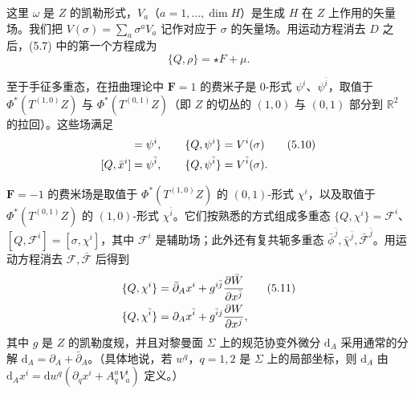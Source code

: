 \documentclass[11pt,a4paper,UTF8]{ctexart}
\theoremstyle{plain}
\theoremstyle{definition}
\begin{document}
这里 $\omega$ 是 $Z$ 的凯勒形式，$V_a$（$a=1,\dots,\dim H$）是生成 $H$ 在 $Z$ 上作用的矢量场。我们把 $V(\sigma)=\sum_a\sigma^aV_a$ 记作对应于 $\sigma$ 的矢量场。用运动方程消去 $D$ 之后，(5.7) 中的第一个方程成为
\begin{equation}
    \{Q,\rho\}=\star F+\mu.
    \tag{5.9}
\end{equation}

至于手征多重态，在扭曲理论中 $\mathbf F=1$ 的费米子是 0-形式 $\psi^i$、$\psi^{\bar i}$，取值于 $\Phi^*(T^{(1,0)}Z)$ 与 $\Phi^*(T^{(0,1)}Z)$（即 $Z$ 的切丛的 $(1,0)$ 与 $(0,1)$ 部分到 $\mathbb R^2$ 的拉回）。这些场满足
\begin{align}
    [Q,x^i]&=\psi^i,\qquad \{Q,\psi^i\}=V^i(\sigma) \tag{5.10}\\
    [Q,\bar x^i]&=\psi^{\bar i},\qquad \{Q,\psi^{\bar i}\}=V^{\bar i}(\sigma). \notag
\end{align}


$\mathbf F=-1$ 的费米场是取值于 $\Phi^*(T^{(1,0)}Z)$ 的 $(0,1)$-形式 $\chi^i$，以及取值于 $\Phi^*(T^{(0,1)}Z)$ 的 $(1,0)$-形式 $\chi^{\bar i}$。它们按熟悉的方式组成多重态 $\{Q,\chi^i\}=\mathcal F^i$、$[Q,\mathcal F^i]=[\sigma,\chi^i]$，其中 $\mathcal F^i$ 是辅助场；此外还有复共轭多重态 $\bar\phi^{\bar j},\bar\chi^{\bar j},\bar{\mathcal F}^{\bar j}$。用运动方程消去 $\mathcal F,\bar{\mathcal F}$ 后得到
\begin{align}
    \{Q,\chi^i\}&=\bar\partial_Ax^i+g^{i\bar j}\frac{\partial\bar W}{\partial x^{\bar j}} \tag{5.11}\\
    \{Q,\chi^{\bar i}\}&=\partial_Ax^{\bar i}+g^{\bar i j}\frac{\partial W}{\partial x^j}, \notag
\end{align}
其中 $g$ 是 $Z$ 的凯勒度规，并且对黎曼面 $\Sigma$ 上的规范协变外微分 $\mathrm d_A$ 采用通常的分解 $\mathrm d_A=\partial_A+\bar\partial_A$。（具体地说，若 $w^q$，$q=1,2$ 是 $\Sigma$ 上的局部坐标，则 $\mathrm d_A$ 由 $\mathrm d_Ax^i=\mathrm dw^q(\partial_qx^i+A_q^aV_a^i)$ 定义。）

\end{document}
